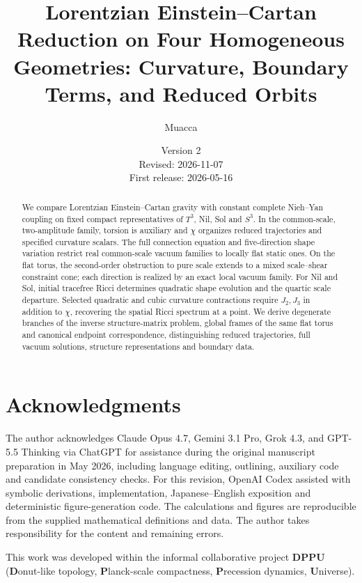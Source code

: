\documentclass[11pt,a4paper]{article}
\title{Lorentzian Einstein--Cartan Reduction on Four Homogeneous Geometries: Curvature, Boundary Terms, and Reduced Orbits}
\author{Muacca}
\date{Version 2\\Revised: 2026-11-07\\First release: 2026-05-16}
\begin{document}
\maketitle
\begin{abstract}
We compare Lorentzian Einstein--Cartan gravity with constant complete Nieh--Yan coupling on fixed compact representatives of $T^3$, Nil, Sol and $S^3$. In the common-scale, two-amplitude family, torsion is auxiliary and $\chi$ organizes reduced trajectories and specified curvature scalars. The full connection equation and five-direction shape variation restrict real common-scale vacuum families to locally flat static ones. On the flat torus, the second-order obstruction to pure scale extends to a mixed scale--shear constraint cone; each direction is realized by an exact local vacuum family. For Nil and Sol, initial tracefree Ricci determines quadratic shape evolution and the quartic scale departure. Selected quadratic and cubic curvature contractions require $J_2,J_3$ in addition to $\chi$, recovering the spatial Ricci spectrum at a point. We derive degenerate branches of the inverse structure-matrix problem, global frames of the same flat torus and canonical endpoint correspondence, distinguishing reduced trajectories, full vacuum solutions, structure representations and boundary data.
\end{abstract}








\section*{Acknowledgments}
The author acknowledges Claude Opus 4.7, Gemini 3.1 Pro, Grok 4.3, and GPT-5.5 Thinking via ChatGPT for assistance during the original manuscript preparation in May 2026, including language editing, outlining, auxiliary code and candidate consistency checks. For this revision, OpenAI Codex assisted with symbolic derivations, implementation, Japanese--English exposition and deterministic figure-generation code. The calculations and figures are reproducible from the supplied mathematical definitions and data. The author takes responsibility for the content and remaining errors.

This work was developed within the informal collaborative project \textbf{DPPU} (\textbf{D}onut-like topology, \textbf{P}lanck-scale compactness, \textbf{P}recession dynamics, \textbf{U}niverse).
\end{document}
